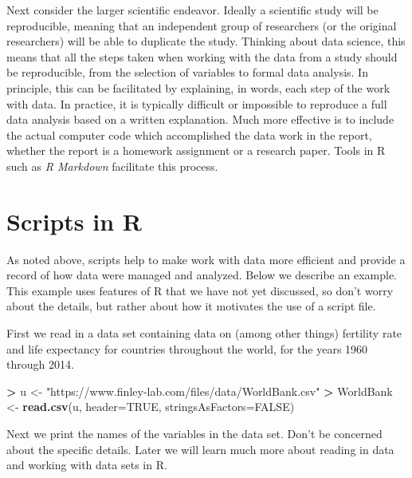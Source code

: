 \documentclass[
]{krantz}
\makeatletter
\newenvironment{Shaded}{\begin{snugshade}}{\end{snugshade}}
\newcommand{\DataTypeTok}[1]{\textcolor[rgb]{0.27,0.27,0.27}{#1}}
\newcommand{\KeywordTok}[1]{\textcolor[rgb]{0.27,0.27,0.27}{\textbf{#1}}}
\newcommand{\NormalTok}[1]{#1}
\newcommand{\OperatorTok}[1]{\textcolor[rgb]{0.43,0.43,0.43}{\textbf{#1}}}
\newcommand{\OtherTok}[1]{\textcolor[rgb]{0.37,0.37,0.37}{#1}}
\newcommand{\StringTok}[1]{\textcolor[rgb]{0.5,0.5,0.5}{#1}}
\newenvironment{kframe}{%
\medskip{}
\setlength{\fboxsep}{.8em}
 \def\at@end@of@kframe{}%
 \ifinner\ifhmode%
  \def\at@end@of@kframe{\end{minipage}}%
  \begin{minipage}{\columnwidth}%
 \fi\fi%
 \def\FrameCommand##1{\hskip\@totalleftmargin \hskip-\fboxsep
 \colorbox{shadecolor}{##1}\hskip-\fboxsep
     \hskip-\linewidth \hskip-\@totalleftmargin \hskip\columnwidth}%
 \MakeFramed {\advance\hsize-\width
   \@totalleftmargin\z@ \linewidth\hsize
   \@setminipage}}%
 {\par\unskip\endMakeFramed%
 \at@end@of@kframe}
\renewenvironment{Shaded}{\begin{kframe}}{\end{kframe}}
\makeatother
\begin{document}
Next consider the larger scientific endeavor. Ideally a scientific study will be reproducible, meaning that an independent group of researchers (or the original researchers) will be able to duplicate the study. Thinking about data science, this means that all the steps taken when working with the data from a study should be reproducible, from the selection of variables to formal data analysis. In principle, this can be facilitated by explaining, in words, each step of the work with data. In practice, it is typically difficult or impossible to reproduce a full data analysis based on a written explanation. Much more effective is to include the actual computer code which accomplished the data work in the report, whether the report is a homework assignment or a research paper. Tools in R such as \emph{R Markdown} facilitate this process.

\hypertarget{scripts-in-r}{%
\section{Scripts in R}\label{scripts-in-r}}

As noted above, scripts help to make work with data more efficient and provide a record of how data were managed and analyzed. Below we describe an example. This example uses features of R that we have not yet discussed, so don't worry about the details, but rather about how it motivates the use of a script file.

First we read in a data set containing data on (among other things) fertility rate and life expectancy for countries throughout the world, for the years 1960 through 2014.

\begin{Shaded}
\begin{Highlighting}[]
\OperatorTok{\textgreater{}}\StringTok{ }\NormalTok{u \textless{}{-}}\StringTok{ "https://www.finley{-}lab.com/files/data/WorldBank.csv"}
\OperatorTok{\textgreater{}}\StringTok{ }\NormalTok{WorldBank \textless{}{-}}\StringTok{ }\KeywordTok{read.csv}\NormalTok{(u, }\DataTypeTok{header=}\OtherTok{TRUE}\NormalTok{, }\DataTypeTok{stringsAsFactors=}\OtherTok{FALSE}\NormalTok{)}
\end{Highlighting}
\end{Shaded}

Next we print the names of the variables in the data set. Don't be concerned about the specific details. Later we will learn much more about reading in data and working with data sets in R.
\end{document}
